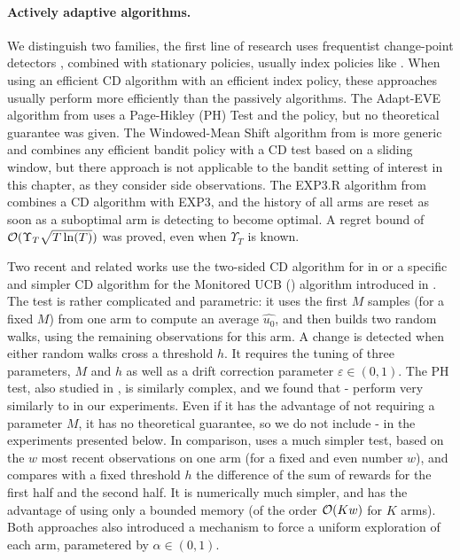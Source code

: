 \paragraph{Actively adaptive algorithms.}
%
We distinguish two families,
the first line of research uses frequentist change-point detectors \cite{Basseville93}, combined with stationary policies, usually index policies like \UCB.
When using an efficient CD algorithm with an efficient index policy, these approaches usually perform more efficiently than the passively algorithms.
%
The Adapt-EVE algorithm from \cite{Hartland06} uses a Page-Hikley (PH) Test and the \UCB{} policy, but no theoretical guarantee was given.
%
The Windowed-Mean Shift algorithm from \cite{YuMannor09} is more generic and combines any efficient bandit policy with a CD test based on a sliding window, but there approach is not applicable to the bandit setting of interest in this chapter, as they consider side observations.
%
The EXP3.R algorithm from \cite{Allesiardo15,Allesiardo17} combines a CD algorithm with EXP3, and the history of all arms are reset as soon as a suboptimal arm is detecting to become optimal.
A regret bound of $\mathcal{O}(\Upsilon_T \sqrt{T \ln(T)})$ was proved, even when $\Upsilon_T$ is known.

Two recent and related works use
the two-sided \CUSUM{} CD algorithm for \CUSUMUCB{} in \cite{LiuLeeShroff17}
or a specific and simpler CD algorithm for the Monitored UCB (\MUCB) algorithm introduced in \cite{CaoZhenKvetonXie18}.
%
The \CUSUM{} test is rather complicated and parametric: it uses the first $M$ samples (for a fixed $M$) from one arm to compute an average $\hat{u_0}$, and then builds two random walks, using the remaining observations for this arm. A change is detected when either random walks cross a threshold $h$.
It requires the tuning of three parameters, $M$ and $h$ as well as a drift correction parameter $\varepsilon\in(0,1)$.
The PH test, also studied in \cite{LiuLeeShroff17}, is similarly complex,
and we found that \PHT-\UCB{} perform very similarly to \CUSUMUCB{} in our experiments.
Even if it has the advantage of not requiring a parameter $M$,
it has no theoretical guarantee, so we do not include \PHT-\UCB{} in the experiments presented below.
%
In comparison, \MUCB{} uses a much simpler test, based on the $w$ most recent observations on one arm (for a fixed and even number $w$), and compares with a fixed threshold $h$ the difference of the sum of rewards for the first half and the second half. It is numerically much simpler, and has the advantage of using only a bounded memory (of the order $\mathop{}\mathopen{}\mathcal{O}\mathopen{}\left(K w\right)$ for $K$ arms).
%
Both approaches also introduced a mechanism to force a uniform exploration of each arm, parametered by $\alpha\in(0,1)$.

